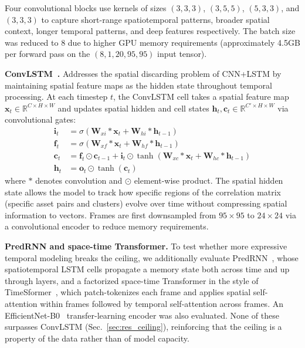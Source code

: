 \documentclass[runningheads]{llncs}
\begin{document}
Four convolutional blocks use kernels of sizes $(3,3,3)$, $(3,5,5)$,
$(5,3,3)$, and $(3,3,3)$ to capture short-range spatiotemporal
patterns, broader spatial context, longer temporal patterns, and
deep features respectively. The batch size was reduced to 8 due to
higher GPU memory requirements (approximately 4.5GB per forward
pass on the $(8, 1, 20, 95, 95)$ input tensor).

\textbf{ConvLSTM~\cite{shi2015convolutional}.} Addresses the
spatial discarding problem of CNN+LSTM by maintaining spatial
feature maps as the hidden state throughout temporal processing.
At each timestep $t$, the ConvLSTM cell takes a spatial feature
map $\mathbf{x}_t \in \mathbb{R}^{C \times H \times W}$ and updates
spatial hidden and cell states $\mathbf{h}_t, \mathbf{c}_t \in
\mathbb{R}^{C' \times H \times W}$ via convolutional gates:
\begin{align}
    \mathbf{i}_t &= \sigma(\mathbf{W}_{xi} \ast \mathbf{x}_t +
                    \mathbf{W}_{hi} \ast \mathbf{h}_{t-1}) \\
    \mathbf{f}_t &= \sigma(\mathbf{W}_{xf} \ast \mathbf{x}_t +
                    \mathbf{W}_{hf} \ast \mathbf{h}_{t-1}) \\
    \mathbf{c}_t &= \mathbf{f}_t \odot \mathbf{c}_{t-1} +
                    \mathbf{i}_t \odot \tanh(\mathbf{W}_{xc}
                    \ast \mathbf{x}_t + \mathbf{W}_{hc}
                    \ast \mathbf{h}_{t-1}) \\
    \mathbf{h}_t &= \mathbf{o}_t \odot \tanh(\mathbf{c}_t)
\end{align}
where $\ast$ denotes convolution and $\odot$ element-wise product.
The spatial hidden state allows the model to track how specific
regions of the correlation matrix (specific asset pairs and clusters)
evolve over time without compressing spatial information to vectors.
Frames are first downsampled from $95\times95$ to $24\times24$ via
a convolutional encoder to reduce memory requirements.

\textbf{PredRNN and space-time Transformer.} To test whether more
expressive temporal modeling breaks the ceiling, we additionally
evaluate PredRNN~\cite{wang2017predrnn}, whose spatiotemporal LSTM
cells propagate a memory state both across time and up through layers,
and a factorized space-time Transformer in the style of
TimeSformer~\cite{bertasius2021space}, which patch-tokenizes each frame
and applies spatial self-attention within frames followed by temporal
self-attention across frames. An EfficientNet-B0~\cite{tan2019efficientnet}
transfer-learning encoder was also evaluated. None of these surpasses
ConvLSTM (Sec.~\ref{sec:res_ceiling}), reinforcing that the ceiling is
a property of the data rather than of model capacity.
\end{document}
